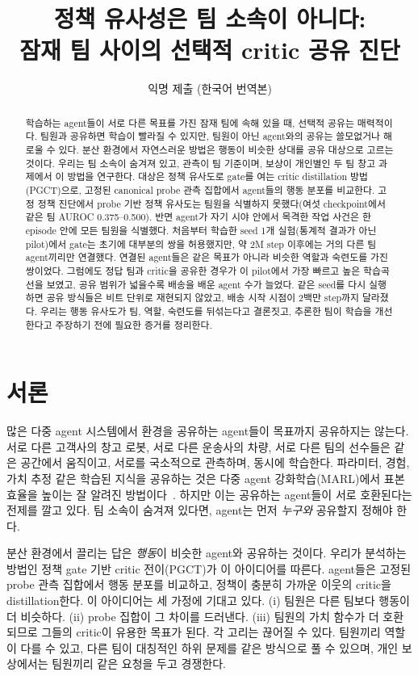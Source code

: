 \documentclass[twocolumn,10pt]{article}
\title{정책 유사성은 팀 소속이 아니다:\\ 잠재 팀 사이의 선택적 critic 공유 진단}
\author{익명 제출 (한국어 번역본)}
\date{}
\begin{document}
\maketitle

\begin{abstract}
학습하는 agent들이 서로 다른 목표를 가진 잠재 팀에 속해 있을 때, 선택적 공유는 매력적이다. 팀원과 공유하면
학습이 빨라질 수 있지만, 팀원이 아닌 agent와의 공유는 쓸모없거나 해로울 수 있다. 분산 환경에서 자연스러운 방법은
행동이 비슷한 상대를 공유 대상으로 고르는 것이다. 우리는 팀 소속이 숨겨져 있고, 관측이 팀 기준이며, 보상이 개인별인
두 팀 창고 과제에서 이 방법을 연구한다. 대상은 정책 유사도로 gate를 여는 critic distillation 방법(PGCT)으로,
고정된 canonical probe 관측 집합에서 agent들의 행동 분포를 비교한다. 고정 정책 진단에서 probe 기반 정책 유사도는
팀원을 식별하지 못했다(여섯 checkpoint에서 같은 팀 AUROC 0.375--0.500). 반면 agent가 자기 시야 안에서 목격한
작업 사건은 한 episode 안에 모든 팀원을 식별했다. 처음부터 학습한 seed 1개 실험(통계적 결과가 아닌 pilot)에서
gate는 초기에 대부분의 쌍을 허용했지만, 약 2M step 이후에는 거의 다른 팀 agent끼리만 연결했다. 연결된 agent들은
같은 목표가 아니라 비슷한 역할과 숙련도를 가진 쌍이었다. 그럼에도 정답 팀과 critic을 공유한 경우가 이 pilot에서 가장
빠르고 높은 학습곡선을 보였고, 공유 범위가 넓을수록 배송을 배운 agent 수가 늘었다. 같은 seed를 다시 실행하면
공유 방식들은 비트 단위로 재현되지 않았고, 배송 시작 시점이 2백만 step까지 달라졌다. 우리는 행동 유사도가 팀, 역할,
숙련도를 뒤섞는다고 결론짓고, 추론한 팀이 학습을 개선한다고 주장하기 전에 필요한 증거를 정리한다.
\end{abstract}

\section{서론}
많은 다중 agent 시스템에서 환경을 공유하는 agent들이 목표까지 공유하지는 않는다. 서로 다른 고객사의 창고 로봇,
서로 다른 운송사의 차량, 서로 다른 팀의 선수들은 같은 공간에서 움직이고, 서로를 국소적으로 관측하며, 동시에
학습한다. 파라미터, 경험, 가치 추정 같은 학습된 지식을 공유하는 것은 다중 agent 강화학습(MARL)에서 표본 효율을
높이는 잘 알려진 방법이다~\cite{christianos2020seac,christianos2021seps}. 하지만 이는 공유하는 agent들이 서로
호환된다는 전제를 깔고 있다. 팀 소속이 숨겨져 있다면, agent는 먼저 \emph{누구와} 공유할지 정해야 한다.

분산 환경에서 끌리는 답은 \emph{행동}이 비슷한 agent와 공유하는 것이다. 우리가 분석하는 방법인 정책 gate 기반 critic
전이(PGCT)가 이 아이디어를 따른다. agent들은 고정된 probe 관측 집합에서 행동 분포를 비교하고, 정책이 충분히 가까운
이웃의 critic을 distillation한다. 이 아이디어는 세 가정에 기대고 있다. (i) 팀원은 다른 팀보다 행동이 더 비슷하다.
(ii) probe 집합이 그 차이를 드러낸다. (iii) 팀원의 가치 함수가 더 호환되므로 그들의 critic이 유용한 목표가 된다.
각 고리는 끊어질 수 있다. 팀원끼리 역할이 다를 수 있고, 다른 팀이 대칭적인 하위 문제를 같은 방식으로 풀 수 있으며,
개인 보상에서는 팀원끼리 같은 요청을 두고 경쟁한다.
\end{document}
